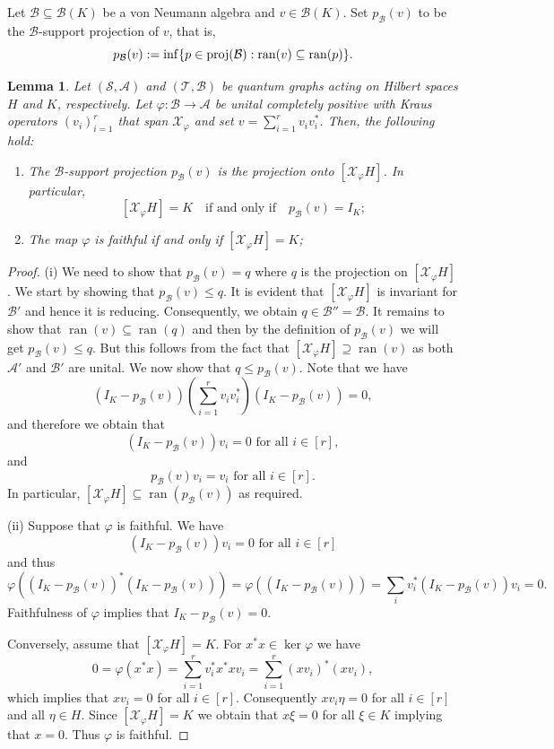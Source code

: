 \documentclass[11pt]{amsart}
\numberwithin{equation}{section}
\theoremstyle{plain}
\newtheorem{lemma}[theorem]{Lemma}
\theoremstyle{definition}
\theoremstyle{remark}
\newcommand{\A}{{\mathcal{A}}}
\newcommand{\B}{{\mathcal{B}}}
\renewcommand{\S}{{\mathcal{S}}}
\newcommand{\T}{{\mathcal{T}}}
\newcommand{\X}{{\mathcal{X}}}
\newcommand\vphi{\varphi}
\newcommand{\foral}{\text{ for all }}
\newcommand{\ran}{\operatorname{ran}}
\begin{document}
Let $\B \subseteq \B(K)$ be a von Neumann algebra and $ v\in \B(K)$. Set $p_\B(v)$ to be the $\B$-support projection of $v$, that is,
\[
p_\B(v):=\inf\{p \in {\rm proj}(\B) : \ran(v) \subseteq \ran(p)\}.
\]
\begin{lemma}\label{L:injectivity}
Let $(\S,\A)$ and $(\T, \B)$ be quantum graphs acting on Hilbert spaces $H$ and $K$, respectively. Let $\vphi \colon \B \to \A$ be unital completely positive with Kraus operators $(v_i)_{i=1}^r$ that span $ \X_{\vphi}$ and set $v=\sum_{i=1}^rv_iv_i^*$. Then, the following hold:
\begin{enumerate}
\item The $\B$-support projection  $p_{\B}(v)$ is the projection onto $ [\X_{\vphi}H]$. In particular, 
\[ 
[\X_\vphi H] = K \quad \text{if and only if} \quad  p_\B(v)=I_K;
\]
\item The map $\vphi $ is faithful if and only if $ [\X_{\vphi}H]=K$;

\end{enumerate}
\end{lemma}
\begin{proof}
\noindent 
(i) We need to show that $p_\B(v)=q$ where $q$ is the projection on $[\X_\vphi H]$. We start by showing that $p_\B(v)\leq q$. It is evident that $[\X_\vphi H]$ is invariant for $\B'$ and hence it is reducing. Consequently, we obtain $q \in \B''= \B$. It remains to show that $\ran(v) \subseteq\ran (q)$ and then by the definition of $p_\B(v)$ we will get $p_\B(v) \leq q$. But this follows from the fact that $[\X_\vphi H] \supseteq \ran(v)$ as both $\A'$ and $\B'$ are unital. We now show that $q\leq p_\B(v)$. Note that we have
\[
(I_K-p_\B(v)) ( \sum_{i=1}^rv_iv_i^*)(I_K -p_\B(v))=0,
\]
and therefore we obtain that 
\[
(I_K-p_\B(v)) v_i =0 \foral i \in [r],
\]
and
\[
p_\B(v)v_i=v_i \foral i \in [r].
\]
In particular, $[\X_\vphi H] \subseteq \ran (p_\B(v))$ as required.

\medskip
\noindent
(ii) Suppose that $\vphi$ is faithful. We have 
\[
(I_K-p_\B(v))v_i=0 \foral i\in[r]
\]
and thus
\[
\vphi((I_K-p_\B(v))^*(I_K-p_\B(v)))=\vphi((I_K-p_\B(v))) = \sum_iv_i^*(I_K-p_\B(v))v_i=0.
\]
Faithfulness of $\vphi$ implies that $I_K-p_\B(v)=0$.

Conversely, assume that $[\X_{\vphi}H]=K$. For $ x^*x\in \ker\vphi$ we have
\[
0=\vphi(x^*x)= \sum_{i=1}^rv_i^*x^*xv_i = \sum_{i=1}^r(xv_i)^* (xv_i),
\]
which implies that $ xv_i=0$ for all $i\in [r]$. Consequently $ x v_i \eta=0$ for all $i\in[r]$ and all $\eta \in H$. Since $ [\X_{\vphi}H]=K$ we obtain that $x \xi=0$ for all $ \xi \in K$ implying that $x=0$. Thus $\vphi$ is faithful. 
\end{proof}
\end{document}
